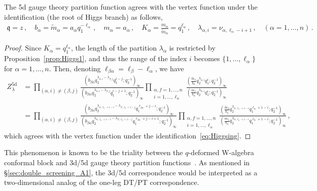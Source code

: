 \begin{proposition}\label{prop:Z_5d}
    The 5d gauge theory partition function agrees with the vertex function under the identification (the root of Higgs branch) as follows,
    \begin{align}
        \mathfrak{q} = z
        \, , \quad 
        b_\alpha = \widetilde{m}_\alpha = a_\alpha q_1^{-\ell_\alpha}
        \, , \quad 
        m_\alpha = a_\alpha 
        \, , \quad
        K_\alpha = \frac{m_\alpha}{\widetilde{m}_\alpha} = q_1^{\ell_\alpha}
        \, , \quad 
        \lambda_{\alpha,i} = \nu_{\alpha,\ell_\alpha - i + 1}
        \, , \quad 
        (\alpha = 1, \ldots, n) \, .
        \label{eq:Higgsing}
    \end{align}
\end{proposition}
\begin{proof}
    Since $K_\alpha = q_1^{\ell_\alpha}$, the length of the partition $\lambda_\alpha$ is restricted by Proposition~\ref{prop:Higgs1}, and thus the range of the index $i$ becomes $\{ 1,\ldots,\ell_\alpha \}$ for $\alpha = 1,\ldots,n$.
    Then, denoting $\ell_{\beta\alpha} = \ell_\beta - \ell_\alpha$, we have
    \begin{align}
    Z^\text{5d}_{\underline{\lambda}}
    & = \prod_{(\alpha,i) \neq (\beta, j)} \frac{(b_{\beta\alpha} q_2^{\lambda_{\alpha,i} - \lambda_{\beta,j}} q_1^{i-j}; q_2^{-1})_\infty}{(b_{\beta\alpha} q_2^{\lambda_{\alpha,i} - \lambda_{\beta,j}} q_1^{i-j+1}; q_2^{-1})_\infty} 
    \prod_{\substack{\alpha, f=1,\ldots,n \\ i = 1,\ldots,\ell_\alpha}} \frac{(\frac{\widetilde{m}_f}{b_\alpha} q_2^{\lambda_{\alpha,i}} q_1^{i};q_2^{-1})_\infty}{(\frac{m_f}{b_\alpha} q_2^{\lambda_{\alpha,i}} q_1^{i};q_2^{-1})_\infty}
    \nonumber \\
    & = \prod_{(\alpha,i) \neq (\beta, j)} \frac{(b_{\beta\alpha} q_2^{\lambda_{\alpha,\ell_\alpha+1-i} - \lambda_{\beta,\ell_\beta+1-j}} q_1^{\ell_{\beta\alpha} + j-i}; q_2^{-1})_\infty}{(b_{\beta\alpha} q_2^{\lambda_{\alpha,\ell_\alpha+1-i} - \lambda_{\beta,\ell_\beta+1-j}} q_1^{\ell_{\beta\alpha} +j-i+1}; q_2^{-1})_\infty} 
    \prod_{\substack{\alpha, f=1,\ldots,n \\ i = 1,\ldots,\ell_\alpha}} \frac{(\frac{\widetilde{m}_f}{b_\alpha} q_2^{\lambda_{\alpha,\ell_\alpha+1-i}} q_1^{\ell_\alpha+1-i};q_2^{-1})_\infty}{(\frac{m_f}{b_\alpha} q_2^{\lambda_{\alpha,\ell_\alpha+1-i}} q_1^{\ell_\alpha+1-i};q_2^{-1})_\infty}
    \, ,
    \end{align}
    which agrees with the vertex function under the identification~\eqref{eq:Higgsing}.
\end{proof}
This phenomenon is known to be the triality between the $q$-deformed W-algebra conformal block and 3d/5d gauge theory partition functions~\cite{Aganagic:2013tta,Aganagic:2014oia,Aganagic:2015cta}.
As mentioned in \S\ref{sec:double_screening_A1}, the 3d/5d correspondence would be interpreted as a two-dimensional analog of the one-leg DT/PT correspondence.

